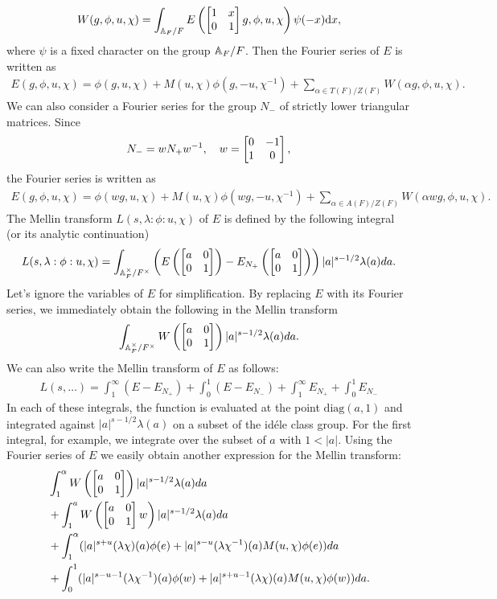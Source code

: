 \begin{align}
    W(g, \phi, u, \chi) = \int_{\mathbb{A}_F /F} E\left(\begin{bmatrix} 1 & x \\ 0 & 1 \end{bmatrix}g, \phi, u, \chi\right)\psi(-x)\mathrm{d} x,
\end{align}
where $\psi$ is a fixed character on the group $\mathbb{A}_F/F$.
Then the Fourier series of $E$ is written as
\begin{align}
    E(g, \phi, u, \chi) = \phi(g, u, \chi) + M(u, \chi) \phi(g, -u, \chi^{-1}) + \sum_{\alpha\in T(F)/Z(F)} W(\alpha g, \phi, u, \chi).
\end{align}
We can also consider a Fourier series for the group $N_{-}$ of strictly lower triangular matrices.
Since
\begin{align}
    N_- = wN_{+}w^{-1}, \quad w = \begin{bmatrix} 0 & -1 \\ 1 & 0 \end{bmatrix},
\end{align}
the Fourier series is written as
\begin{align}
    E(g, \phi, u, \chi) = \phi(wg, u, \chi) + M(u, \chi) \phi(wg, -u, \chi^{-1}) + \sum_{\alpha\in A(F)/Z(F)} W(\alpha w g, \phi, u, \chi).
\end{align}
The Mellin transform $L(s, \lambda:\phi:u, \chi)$ of $E$ is defined by the following integral (or its analytic continuation)
\begin{align}
    L(s, \lambda:\phi:u, \chi) = \int_{\mathbb{A}_F^\times /F^\times} \left( E\left(\begin{bmatrix} a & 0 \\ 0 & 1 \end{bmatrix}\right) - E_{N_{+}}\left(\begin{bmatrix} a & 0 \\ 0 & 1 \end{bmatrix}\right)\right) |a|^{s-1/2} \lambda(a) da.
\end{align}
Let's ignore the variables of $E$ for simplification.
By replacing $E$ with its Fourier series, we immediately obtain the following in the Mellin transform
\begin{align}
    \int_{\mathbb{A}_F^\times /F^\times} W\left(\begin{bmatrix} a & 0 \\ 0 & 1 \end{bmatrix}\right) |a|^{s-1/2} \lambda(a) da.
\end{align}
We can also write the Mellin transform of $E$ as follows:
\begin{align}
\label{eqn:8.2.12}
    L(s, \dots) =\int_{1}^{\infty} (E-E_{N_{+}}) + \int_{0}^{1} (E-E_{N_{-}}) + \int_{1}^{\infty} E_{N_+} + \int_{0}^{1} E_{N_{-}}
\end{align}
In each of these integrals, the function is evaluated at the point $\mathrm{diag}(a, 1)$ and integrated against $|a|^{s-1/2}\lambda(a)$ on a subset of the id\'ele class group.
For the first integral, for example, we integrate over the subset of $a$ with $1<|a|$.
Using the Fourier series of $E$ we easily obtain another expression for the Mellin transform:
\begin{equation}
\begin{aligned}
    &\int_{1}^{\alpha} W\left(\begin{bmatrix} a & 0 \\ 0 & 1 \end{bmatrix}\right)|a|^{s-1/2} \lambda(a) da \\
    &+ \int_{1}^{a} W\left(\begin{bmatrix} a & 0 \\ 0 & 1 \end{bmatrix}w\right)|a|^{s-1/2} \lambda(a) da  \\
    &+ \int_{1}^{\alpha} (|a|^{s+u}(\lambda \chi)(a)\phi(e) + |a|^{s-u}(\lambda\chi^{-1})(a)M(u, \chi)\phi(e)) da  \\
    &+ \int_{0}^{1} (|a|^{s-u-1} (\lambda \chi^{-1})(a) \phi(w) + |a|^{s+u-1}(\lambda\chi)(a) M(u, \chi)\phi(w)) da. 
\end{aligned}
\end{equation}

